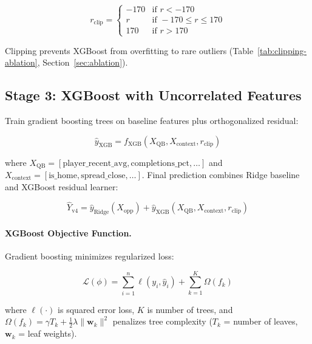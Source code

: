 \begin{equation}
r_{\text{clip}} = \begin{cases}
-170 & \text{if } r < -170 \\
r & \text{if } -170 \le r \le 170 \\
170 & \text{if } r > 170
\end{cases}
\label{eq:residual-clipping}
\end{equation}

Clipping prevents XGBoost from overfitting to rare outliers (Table~\ref{tab:clipping-ablation}, Section~\ref{sec:ablation}).

\subsection{Stage 3: XGBoost with Uncorrelated Features}

Train gradient boosting trees on baseline features plus orthogonalized residual:

\begin{equation}
\hat{y}_{\text{XGB}} = f_{\text{XGB}}(X_{\text{QB}}, X_{\text{context}}, r_{\text{clip}})
\label{eq:xgboost-stage}
\end{equation}

where $X_{\text{QB}} = [\text{player\_recent\_avg}, \text{completions\_pct}, \ldots]$ and $X_{\text{context}} = [\text{is\_home}, \text{spread\_close}, \ldots]$. Final prediction combines Ridge baseline and XGBoost residual learner:

\begin{equation}
\hat{Y}_{\text{v4}} = \hat{y}_{\text{Ridge}}(X_{\text{opp}}) + \hat{y}_{\text{XGB}}(X_{\text{QB}}, X_{\text{context}}, r_{\text{clip}})
\label{eq:final-prediction}
\end{equation}

\paragraph{XGBoost Objective Function.}
Gradient boosting minimizes regularized loss:

\begin{equation}
\mathcal{L}(\phi) = \sum_{i=1}^{n} \ell(y_i, \hat{y}_i) + \sum_{k=1}^{K} \Omega(f_k)
\label{eq:xgboost-objective}
\end{equation}

where $\ell(\cdot)$ is squared error loss, $K$ is number of trees, and $\Omega(f_k) = \gamma T_k + \frac{1}{2} \lambda \|\mathbf{w}_k\|^2$ penalizes tree complexity ($T_k$ = number of leaves, $\mathbf{w}_k$ = leaf weights).

